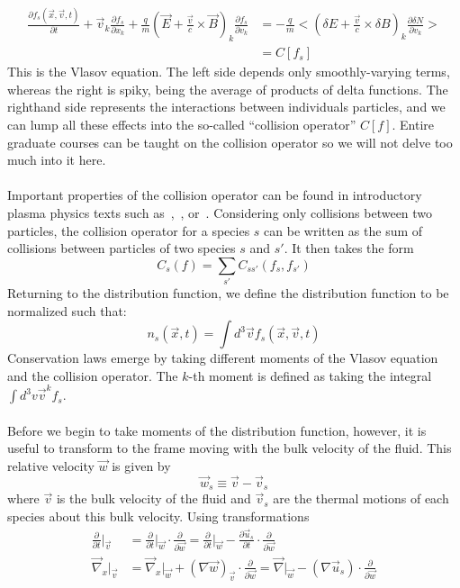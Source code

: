 \begin{align}
  \frac{\partial f_s(\vec x,\vec v,t)}{\partial t}+\vec v_k\frac{\partial f_s}{\partial x_k}+\frac qm (\vec E+\frac{\vec v}{c}\times\vec B)_k\frac{\partial f_s}{\partial v_k}&=-\frac qm<(\delta E+\frac{\vec v}{c}\times\delta B)_k\frac{\partial \delta N}{\partial v_k}>\nonumber\\
  &=C[f_s] \label{eq:vlasov}
\end{align}
This is the Vlasov equation. The left side depends only smoothly-varying terms, whereas the right is spiky, being the average of products of delta functions. The righthand side represents the interactions between individuals particles, and we can lump all these effects into the so-called ``collision operator'' $C[f]$. Entire graduate courses can be taught on the collision operator so we will not delve too much into it here.\\
\\
Important properties of the collision operator can be found in introductory plasma physics texts such as~\citet{Nicholson1983},~\citet{Hazeltine2004}, or~\citet{KunzLecture1}. Considering only collisions between two particles, the collision operator for a species $s$ can be written as the sum of collisions between particles of two species $s$ and $s'$. It then takes the form
\begin{equation}
  C_s(f)=\sum_{s'}C_{ss'}(f_s,f_{s'})
\end{equation}
Returning to the distribution function, we define the distribution function to be normalized such that:
\begin{equation}
  n_s(\vec x,t)=\int d^3\vec v f_s(\vec x,\vec v, t)\label{eq:nnorm}
\end{equation}
Conservation laws emerge by taking different moments of the Vlasov equation and the collision operator. The $k$-th moment is defined as taking the integral $\int d^3v \vec v^k f_s$.\\
\\
Before we begin to take moments of the distribution function, however, it is useful to transform to the frame moving with the bulk velocity of the fluid. This relative velocity $\vec w$ is given by
\begin{equation}
  \vec w_s\equiv\vec v-\vec v_s
\end{equation}
where $\vec v$ is the bulk velocity of the fluid and $\vec v_s$ are the thermal motions of each species about this bulk velocity.
Using transformations
\begin{align*}
  \frac{\partial}{\partial t}\vert_{\vec v}&=\frac{\partial}{\partial t}\vert_{\vec w}\cdot\frac{\partial}{\partial \vec w}=\frac{\partial}{\partial t}\vert_{\vec w}-\frac{\partial\vec u_s}{\partial t}\cdot\frac\partial{\partial\vec w}\\
  \vec\nabla_x\vert_{\vec v}&=\vec\nabla_x\vert_{\vec w}+(\nabla\vec w)_{\vec v}\cdot\frac{\partial}{\partial\vec w}=\vec\nabla\vert_{\vec w}-(\nabla\vec u_s)\cdot\frac{\partial}{\partial\vec w}
\end{align*}
